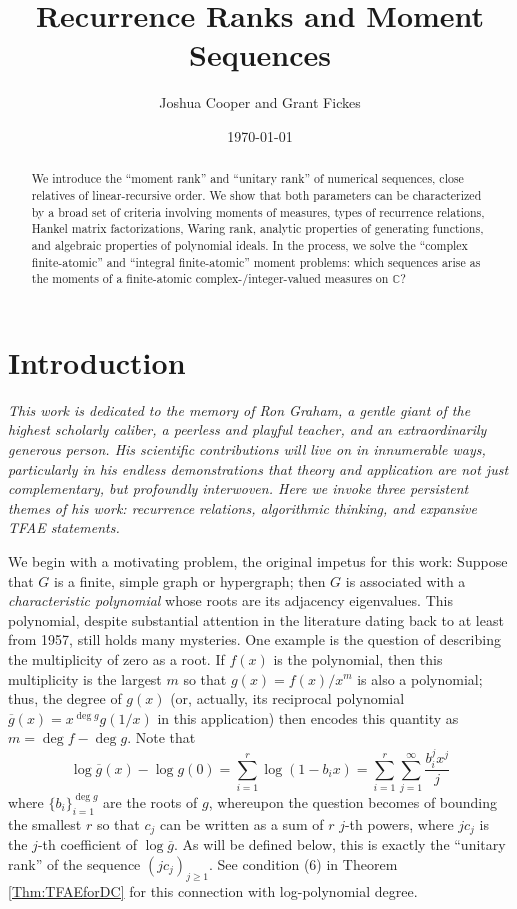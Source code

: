 \documentclass[12pt,reqno]{article}
\title{Recurrence Ranks and Moment Sequences}
\author{Joshua Cooper and Grant Fickes}
\date{\today}
\begin{document}
\maketitle


\begin{abstract}
    We introduce the ``moment rank'' and ``unitary rank'' of numerical sequences, close relatives of linear-recursive order.  We show that both parameters can be characterized by a broad set of criteria involving moments of measures, types of recurrence relations, Hankel matrix factorizations, Waring rank, analytic properties of generating functions, and algebraic properties of polynomial ideals.  In the process, we solve the ``complex finite-atomic'' and ``integral finite-atomic'' moment problems: which sequences arise as the moments of a finite-atomic complex-/integer-valued measures on $\mathbb{C}$?
\end{abstract}


\section{Introduction}

\textit{This work is dedicated to the memory of Ron Graham, a gentle giant of the highest scholarly caliber, a peerless and playful teacher, and an extraordinarily generous person. His scientific contributions will live on in innumerable ways, particularly in his endless demonstrations that theory and application are not just complementary, but profoundly interwoven. Here we invoke three persistent themes of his work: recurrence relations, algorithmic thinking, and expansive TFAE statements.\\}  

We begin with a motivating problem, the original impetus for this work: Suppose that $G$ is a finite, simple graph or hypergraph; then $G$ is associated with a {\it characteristic polynomial} whose roots are its adjacency eigenvalues.  This polynomial, despite substantial attention in the literature dating back to at least \cite{CoSi57} from 1957, still holds many mysteries.  One example is the question of describing the multiplicity of zero as a root.  If $f(x)$ is the polynomial, then this multiplicity is the largest $m$ so that $g(x) = f(x)/x^m$ is also a polynomial; thus, the degree of $g(x)$ (or, actually, its reciprocal polynomial $\overline{g}(x) = x^{\deg g}g(1/x)$ in this application) then encodes this quantity as $m = \deg f - \deg g$.  Note that 
$$
\log \overline{g}(x) - \log g(0) = \sum_{i=1}^r \log(1-b_i x) = \sum_{i=1}^r \sum_{j=1}^\infty \frac{b_i^j x^j}{j}
$$
where $\{b_i\}_{i =1}^{\deg g}$ are the roots of $g$, whereupon the question becomes of bounding the smallest $r$ so that $c_j$ can be written as a sum of $r$ $j$-th powers, where $j c_j$ is the $j$-th coefficient of $\log \overline{g}$.  As will be defined below, this is exactly the ``unitary rank'' of the sequence $(jc_j)_{j \geq 1}$.  See condition (6) in Theorem \ref{Thm:TFAEforDC} for this connection with log-polynomial degree.
\end{document}
